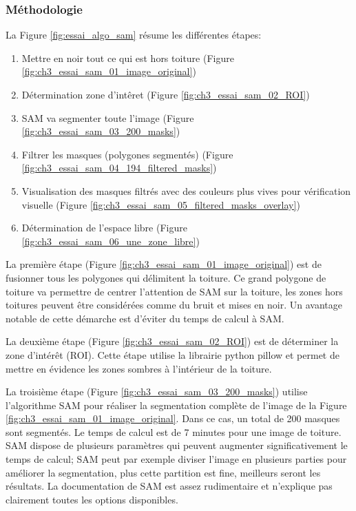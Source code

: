 \subsubsection{Méthodologie}
La Figure \ref{fig:essai_algo_sam} résume les différentes étapes:
\begin{enumerate}
    \item Mettre en noir tout ce qui est hors toiture (Figure \ref{fig:ch3_essai_sam_01_image_original})
    \item Détermination zone d'intêret (Figure \ref{fig:ch3_essai_sam_02_ROI})
    \item SAM va segmenter toute l'image (Figure \ref{fig:ch3_essai_sam_03_200_masks})
    \item Filtrer les masques (polygones segmentés) (Figure \ref{fig:ch3_essai_sam_04_194_filtered_masks})
    \item Visualisation des masques filtrés avec des couleurs plus vives pour vérification visuelle (Figure \ref{fig:ch3_essai_sam_05_filtered_masks_overlay})
    \item Détermination de l'espace libre (Figure \ref{fig:ch3_essai_sam_06_une_zone_libre})
\end{enumerate}

La première étape (Figure \ref{fig:ch3_essai_sam_01_image_original}) est de fusionner tous les polygones qui délimitent la toiture. Ce grand polygone de toiture va permettre de centrer l'attention de SAM sur la toiture, les zones hors toitures peuvent être considérées comme du bruit et mises en noir. Un avantage notable de cette démarche est d'éviter du temps de calcul à SAM.

La deuxième étape (Figure \ref{fig:ch3_essai_sam_02_ROI}) est de déterminer la zone d'intérêt (ROI). Cette étape utilise la librairie python pillow et permet de mettre en évidence les zones sombres à l'intérieur de la toiture.

La troisième étape (Figure \ref{fig:ch3_essai_sam_03_200_masks}) utilise l'algorithme SAM pour réaliser la segmentation complète de l'image de la Figure \ref{fig:ch3_essai_sam_01_image_original}. Dans ce cas, un total de 200 masques sont segmentés. Le temps de calcul est de 7 minutes pour une image de toiture. SAM dispose de plusieurs paramètres qui peuvent augmenter significativement le temps de calcul; SAM peut par exemple diviser l'image en plusieurs parties pour améliorer la segmentation, plus cette partition est fine, meilleurs seront les résultats. La documentation de SAM est assez rudimentaire et n'explique pas clairement toutes les options disponibles.


